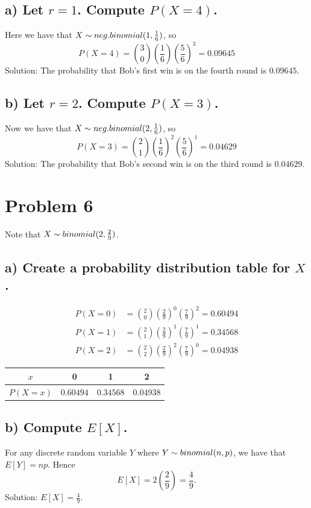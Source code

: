 \documentclass[11pt, letterpaper]{article}
\begin{document}
\subsection*{a) \normalfont Let $r=1$. Compute $P(X=4)$.}
Here we have that $X\sim neg.\space binomial(1,\space \frac{1}{6})$, so 
\[P(X=4)={3\choose 0}\left(\frac{1}{6}\right)\left(\frac{5}{6}\right)^3=0.09645\]
Solution: The probability that Bob's first win is on the fourth round is $0.09645$.
\subsection*{b) \normalfont Let $r=2$. Compute $P(X=3)$.}
Now we have that $X\sim neg.\space binomial(2,\space \frac{1}{6})$, so
\[P(X=3)={2\choose 1}\left(\frac{1}{6}\right)^2\left(\frac{5}{6}\right)^1=0.04629\]
Solution: The probability that Bob's second win is on the third round is $0.04629$.

\section*{Problem 6}
Note that $X\sim binomial(2,\space \frac{2}{9})$.
\subsection*{a) \normalfont Create a probability distribution table for $X$.}
\begin{align*}
    P(X=0)&={2\choose 0}\left(\frac{2}{9}\right)^0\left(\frac{7}{9}\right)^2=0.60494\\
    P(X=1)&={2\choose 1}\left(\frac{2}{9}\right)^1\left(\frac{7}{9}\right)^1=0.34568\\
    P(X=2)&={2\choose 2}\left(\frac{2}{9}\right)^2\left(\frac{7}{9}\right)^0=0.04938
\end{align*}
\begin{table}[h!]
    \begin{center}
        \begin{tabular}{c|c|c|c}
            $x$ & 0 & 1 & 2\\
            \hline
            $P(X=x)$ & $0.60494$ & $0.34568$ & $0.04938$ 
        \end{tabular}
    \end{center}
\end{table}
\subsection*{b) \normalfont Compute $E[X]$.}
For any discrete random variable $Y$ where $Y\sim binomial(n,\space p)$, we have that $E[Y]=np$. Hence
\[E[X]=2\left(\frac{2}{9}\right)=\frac{4}{9}.\]
Solution: $E[X]=\frac{4}{9}$.
\end{document}
